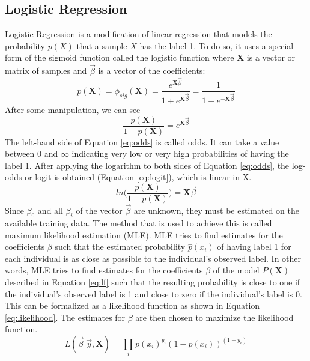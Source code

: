 \subsection{Logistic Regression}
Logistic Regression is a modification of linear regression that models the 
probability $p(X)$ that a sample $X$ has the label 1. To do so, it uses a 
special form of the sigmoid function called the logistic function where 
$\mathbf{X}$ is a vector or matrix of samples and $\vec{\beta}$ is a vector of 
the coefficients:
\begin{equation}
 p(\mathbf{X}) = \phi_{sig}(\mathbf{X}) = 
\frac{e^{\mathbf{X}\vec{\beta}}}{1+e^{\mathbf{X}\vec{\beta}}} = 
\frac{1}{1+e^{-\mathbf{X}\vec{\beta}}}
 \label{eq:lf}
\end{equation}
After some manipulation, we can see
\begin{equation}
 \frac{p(\mathbf{X})}{1-p(\mathbf{X})} = e^{\mathbf{X}\vec{\beta}}
 \label{eq:odds}
\end{equation}
The left-hand side of Equation \ref{eq:odds} is called odds. It can take a 
value between 0 and $\infty$ indicating very low or very high probabilities 
of having the label 1.
After applying the logarithm to both sides of Equation \ref{eq:odds}, the 
log-odds or logit is obtained (Equation \ref{eq:logit}), which is linear in X.
\begin{equation}
 ln \Big( \frac{p(\mathbf{X})}{1-p(\mathbf{X})} \Big) = \mathbf{X}\vec{\beta}
 \label{eq:logit}
\end{equation}
Since $\beta_0$ and all $\beta_i$ of the vector $\vec{\beta}$ are unknown, 
they must be estimated on the 
available training data. The method that is used to achieve this is called 
maximum likelihood estimation (MLE). MLE tries to find estimates for the 
coefficients $\beta$ such that the estimated probability $\hat{p}(x_i)$ of 
having label 1 for each individual is as close as possible to the individual's 
observed label. In other words, MLE tries to find estimates for the 
coefficients $\beta$ of the model $P(\mathbf{X})$ described in Equation 
\ref{eq:lf} such that the resulting probability is close to one if the 
individual's observed label is 1 and close to zero if the individual's label is 
0. This can be formalized as a likelihood function as shown in Equation 
\ref{eq:likelihood}. The estimates for $\beta$ are then chosen to maximize the 
likelihood function.\cite{RN166}
\begin{equation}
 L(\vec{\beta}|\vec{y}, \mathbf{X}) = \prod_{i} p(x_i)^{y_i} 
(1-p(x_i))^{(1-y_i)}
\label{eq:likelihood}
\end{equation}
